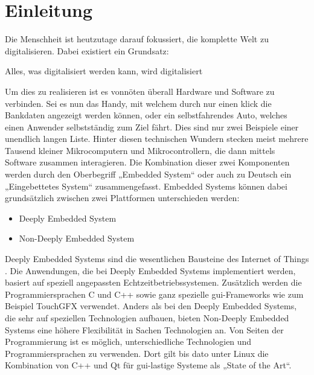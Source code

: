 \chapter{Einleitung}
\label{chap:einleitung}
Die Menschheit ist heutzutage darauf fokussiert, die komplette Welt zu digitalisieren. Dabei
existiert ein Grundsatz:
\begin{zitat}
    Alles, was digitalisiert werden kann, wird digitalisiert \cite{digitalisierteWelt}
\end{zitat}

Um dies zu realisieren ist es vonnöten überall Hardware und Software zu verbinden. Sei es nun das
Handy, mit welchem durch nur einen klick die Bankdaten angezeigt werden können, oder ein
selbstfahrendes Auto, welches einen Anwender selbstständig zum Ziel fährt. Dies sind nur zwei
Beispiele einer unendlich langen Liste. Hinter diesen technischen Wundern stecken meist
mehrere Tausend kleiner Mikrocomputern und Mikrocontrollern, die dann mittels Software zusammen
interagieren. Die Kombination dieser zwei Komponenten werden durch den Oberbegriff „Embedded
System“ oder auch zu Deutsch ein „Eingebettetes System“ zusammengefasst.
\newline
\newline
Embedded Systems können dabei grundsätzlich zwischen zwei Plattformen unterschieden werden:
\begin{itemize}
    \item Deeply Embedded System
    \item Non-Deeply Embedded System
\end{itemize}
\newline
\newline
Deeply Embedded Systems sind die wesentlichen Bausteine des Internet of Things
\cite{HochschuleniederrheimDeeply}. Die Anwendungen,
die bei Deeply Embedded Systems implementiert werden, basiert auf speziell angepassten
Echtzeitbetriebssystemen. Zusätzlich werden die Programmiersprachen C und C++ sowie ganz spezielle
\ac{gui}-Frameworks wie zum Beispiel TouchGFX verwendet.
\newline
\newline
Anders als bei den Deeply Embedded Systems, die sehr auf speziellen Technologien aufbauen, bieten
Non-Deeply Embedded Systems eine höhere Flexibilität in Sachen Technologien an. Von Seiten der
Programmierung ist es möglich, unterschiedliche Technologien und Programmiersprachen zu verwenden.
Dort gilt bis dato unter Linux die Kombination von C++ und Qt für \ac{gui}-lastige Systeme als
„State of the Art“.
